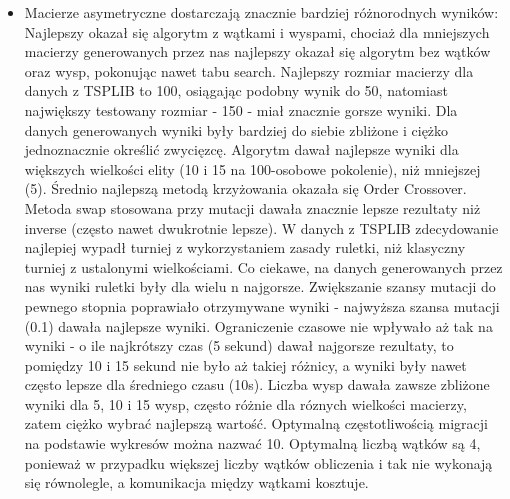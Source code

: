 \documentclass{article}
\begin{document}
\begin{itemize}
\item Macierze asymetryczne dostarczają znacznie bardziej różnorodnych wyników:
\subitem Najlepszy okazał się algorytm z wątkami i wyspami, chociaż dla mniejszych macierzy generowanych przez nas najlepszy okazał się algorytm bez wątków oraz wysp, pokonując nawet tabu search.
\subitem Najlepszy rozmiar macierzy dla danych z TSPLIB to 100, osiągając podobny wynik do 50, natomiast największy testowany rozmiar - 150 - miał znacznie gorsze wyniki. Dla danych generowanych wyniki były bardziej do siebie zbliżone i ciężko jednoznacznie określić zwycięzcę.
\subitem Algorytm dawał najlepsze wyniki dla większych wielkości elity (10 i 15 na 100-osobowe pokolenie), niż mniejszej (5).
\subitem Średnio najlepszą metodą krzyżowania okazała się Order Crossover.
\subitem Metoda swap stosowana przy mutacji dawała znacznie lepsze rezultaty niż inverse (często nawet dwukrotnie lepsze).
\subitem W danych z TSPLIB zdecydowanie najlepiej wypadł turniej z wykorzystaniem zasady ruletki, niż klasyczny turniej z ustalonymi wielkościami. Co ciekawe, na danych generowanych przez nas wyniki ruletki były dla wielu n najgorsze.
\subitem Zwiększanie szansy mutacji do pewnego stopnia poprawiało otrzymywane wyniki - najwyższa szansa mutacji (0.1) dawała najlepsze wyniki.
\subitem Ograniczenie czasowe nie wpływało aż tak na wyniki - o ile najkrótszy czas (5 sekund) dawał najgorsze rezultaty, to pomiędzy 10 i 15 sekund nie było aż takiej różnicy, a wyniki były nawet często lepsze dla średniego czasu (10s).
\subitem Liczba wysp dawała zawsze zbliżone wyniki dla 5, 10 i 15 wysp, często różnie dla róznych wielkości macierzy, zatem ciężko wybrać najlepszą wartość.
\subitem Optymalną częstotliwością migracji na podstawie wykresów można nazwać 10.
\subitem Optymalną liczbą wątków są 4, ponieważ w przypadku większej liczby wątków obliczenia i tak nie wykonają się równolegle, a komunikacja między wątkami kosztuje.
\end{itemize}
\end{document}
